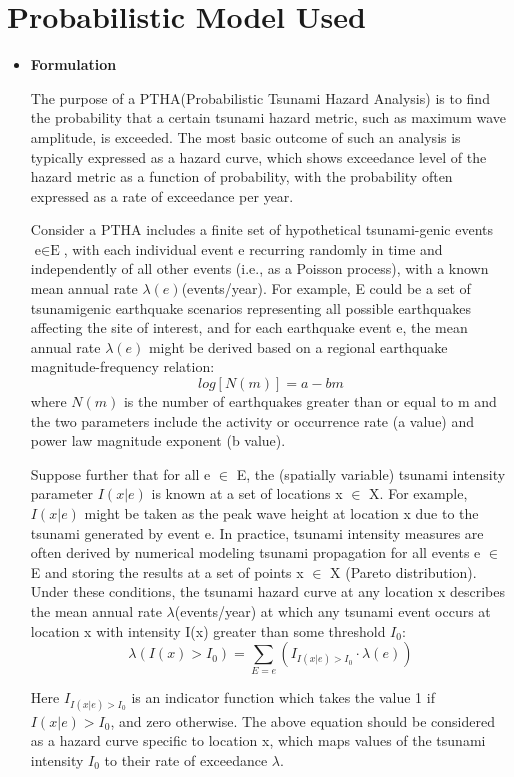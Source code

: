\documentclass{article}
\begin{document}
\section {Probabilistic Model Used}
\begin{itemize}
\item \large \textbf{Formulation}

  \normalsize The purpose of a PTHA(Probabilistic Tsunami Hazard Analysis) is to find the probability that a certain tsunami hazard metric, such as maximum wave
  amplitude, is exceeded. The most basic outcome of such an analysis is typically expressed as a hazard curve, which shows exceedance level of the hazard metric as a function of probability, with the probability often expressed as a rate of exceedance per year.

  Consider a PTHA includes a finite set of hypothetical tsunami-genic events $\text{e} \in \text{E}$, with each individual event e recurring randomly in time and independently of all other events (i.e., as a Poisson process), with a known mean annual rate $\lambda(e)$(events/year). For example, E could be a set of tsunamigenic earthquake scenarios representing all possible earthquakes affecting the site of interest, and for each earthquake event e, the mean annual rate $\lambda(e)$ might be derived based on a regional earthquake magnitude-frequency relation: \[log[N(m)] = a - bm\]
  where $N(m)$ is the number of earthquakes greater than or equal to m and the two parameters include the activity or occurrence rate (a value) and power law magnitude exponent (b value).

  Suppose further that for all e $\in$ E, the (spatially variable)
  tsunami intensity parameter $I(x|e)$ is known at a set of locations x $\in$ X. For example, $I(x|e)$ might be taken as the peak wave height at location x due to the tsunami generated by event e. In practice, tsunami intensity measures are often derived by numerical modeling tsunami propagation for all events e $\in$ E and storing the results at a set of points x $\in$ X (Pareto distribution). Under these conditions, the tsunami hazard curve at any location x describes the mean annual rate $\lambda$(events/year) at which any tsunami event occurs at location x with intensity I(x) greater than
  some threshold $I_{0}$:
  \[\lambda\left(I(x) > I_{0}\right) = \sum_{E = e}\left(I_{I(x|e)>I_{0}}\cdot\lambda(e)\right)\]

  Here $I_{I(x|e)>I_{0}}$ is an indicator function which takes the value 1 if $I(x|e)>I_{0}$, and zero otherwise. The above equation should be considered as a hazard curve specific to location x, which maps values of the tsunami intensity $I_{0}$ to their rate of exceedance $\lambda$.


\end{itemize}
\end{document}
